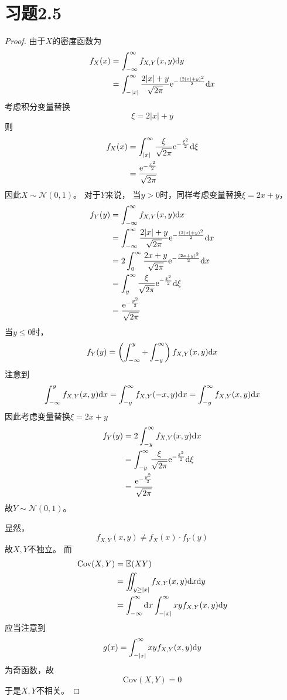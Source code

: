 \documentclass[cn]{homework}
\newcommand{\E}{\mathbb E}
\newcommand{\cov}{\mathrm{Cov}}
\begin{document}
    \section{习题2.5}
    \begin{proof}
        由于$X$的密度函数为
        \newcommand{\pdf}{\frac{2|x|+y}{\sqrt{2\pi}}\e^{-\frac{(2|x|+y)^2}{2}}}
        \newcommand{\npdf}{\frac{2x+y}{\sqrt{2\pi}}\e^{-\frac{(2x+y)^2}{2}}}
        \newcommand{\xipdf}{\frac{\xi}{\sqrt{2\pi}}\e^{-\frac{\xi^2}{2}}}
        \[\begin{aligned}
            f_X(x)&=\int_{-\infty}^\infty f_{X,Y}(x,y)\diff y\\
            &=\int_{-|x|}^\infty\pdf\diff x
        \end{aligned}\]
        考虑积分变量替换
        \[\xi=2|x|+y\]
        则
        \[\begin{aligned}
            f_X(x)&=\int_{|x|}^\infty\xipdf\diff\xi\\
            &=\frac{\e^{-\frac{x^2}{2}}}{\sqrt{2\pi}}
        \end{aligned}\]
        因此$X\sim\mathcal N(0,1)$。
        对于$Y$来说，
        当$y>0$时，同样考虑变量替换$\xi=2x+y$，
        \[\begin{aligned}
            f_Y(y)&=\int_{-\infty}^\infty f_{X,Y}(x,y)\diff x\\
            &=\int_{-\infty}^\infty\pdf\diff x\\
            &=2\int_0^\infty\npdf\diff x\\
            &=\int_y^\infty\xipdf\diff\xi\\
            &=\frac{\e^{-\frac{y^2}{2}}}{\sqrt{2\pi}}
        \end{aligned}\]
        当$y\leq 0$时，
        \[f_Y(y)=\left(\int_{-\infty}^y+\int_{-y}^\infty\right)
        f_{X,Y}(x,y)\mathrm d x\]
        注意到
        \[\int_{-\infty}^yf_{X,Y}(x,y)\mathrm d x
        =\int_{-y}^\infty f_{X,Y}(-x,y)\mathrm d x
        =\int_{-y}^\infty f_{X,Y}(x,y)\mathrm d x\]
        因此考虑变量替换$\xi=2x+y$
        \[\begin{aligned}
            f_Y(y)&=2\int_{-y}^\infty f_{X,Y}(x,y)\diff x\\
            &=\int_{-y}^\infty\xipdf\diff\xi\\
            &=\frac{\e^{-\frac{y^2}{2}}}{\sqrt{2\pi}}
        \end{aligned}\]
        故$Y\sim\mathcal N(0,1)$。

        显然，
        \[f_{X,Y}(x,y)\neq f_X(x)\cdot f_Y(y)\]
        故$X,Y$不独立。
        而
        \[\begin{aligned}
           \cov(X,Y)&=\E(XY)\\ 
           &=\iint_{y\geq |x|}f_{X,Y}(x,y)\diff x\diff y\\
           &=\int_{-\infty}^\infty\diff x
           \int_{-|x|}^\infty xyf_{X,Y}(x,y)\diff y
        \end{aligned}\]
        应当注意到
        \[g(x)=\int_{-|x|}^\infty xyf_{X,Y}(x,y)\mathrm d y\]
        为奇函数，故
        \[\cov(X,Y)=0\]
        于是$X,Y$不相关。
    \end{proof}
\end{document}
